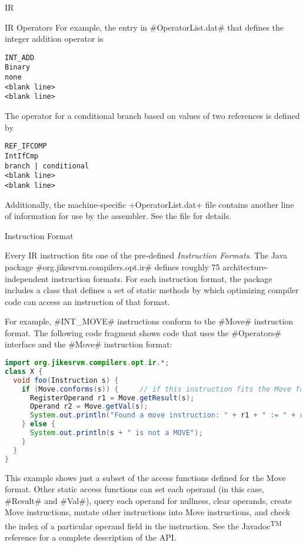 \begin{section}{IR}
\begin{subsection}{IR Operators}
For example, the entry in \spverb#OperatorList.dat# that defines the integer addition operator is
\begin{lstlisting}
INT_ADD
Binary
none
<blank line>
<blank line>
\end{lstlisting}

The operator for a conditional branch based on values of two references is defined by
\begin{lstlisting}
REF_IFCOMP
IntIfCmp
branch | conditional
<blank line>
<blank line>
\end{lstlisting}
Additionally, the machine-specific \spverb+OperatorList.dat+ file contains another line of information for use by the assembler. See the file for details.

\end{subsection}


\begin{subsection}{Instruction Format}

Every IR instruction fits one of the pre-defined \textit{Instruction Formats}. The Java package \spverb#org.jikesrvm.compilers.opt.ir# defines roughly 75 architecture\hyp independent instruction formats. For each instruction format, the package includes a class that defines a set of static methods by which optimizing compiler code can access an instruction of that format.

For example, \spverb#INT_MOVE# instructions conform to the \spverb#Move# instruction format. The following code fragment shows code that uses the \spverb#Operators# interface and the \spverb#Move# instruction format:

\begin{lstlisting}[language=Java]
import org.jikesrvm.compilers.opt.ir.*;
class X {
  void foo(Instruction s) {
    if (Move.conforms(s)) {     // if this instruction fits the Move format
      RegisterOperand r1 = Move.getResult(s);
      Operand r2 = Move.getVal(s);
      System.out.println("Found a move instruction: " + r1 + " := " + r2);
    } else {
      System.out.println(s + " is not a MOVE");
    }
  }
}
\end{lstlisting}

This example shows just a subset of the access functions defined for the Move format. Other static access functions can set each operand (in this case, \spverb#Result# and \spverb#Val#), query each operand for nullness, clear operands, create Move instructions, mutate other instructions into Move instructions, and check the index of a particular operand field in the instruction. See the Javadoc\textsuperscript{TM} reference for a complete description of the API.


\end{subsection}
\end{section}
